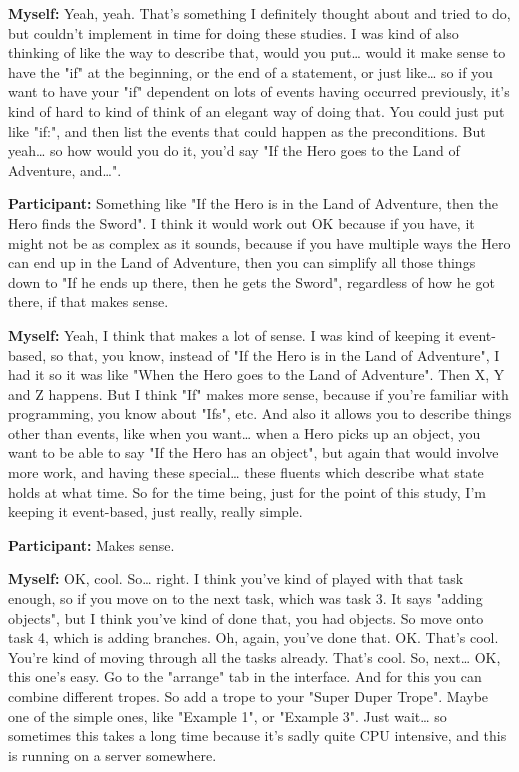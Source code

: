 \documentclass[11pt]{report}
\begin{document}
\begin{linenumbers}
\textbf{Myself:} Yeah, yeah. That's something I definitely thought about and tried to do, but couldn't implement in time for doing these studies. I was kind of also thinking of like the way to describe that, would you put\ldots{} would it make sense to have the "if" at the beginning, or the end of a statement, or just like\ldots{} so if you want to have your "if" dependent on lots of events having occurred previously, it's kind of hard to kind of think of an elegant way of doing that. You could just put like "if:", and then list the events that could happen as the preconditions. But yeah\ldots{} so how would you do it, you'd say "If the Hero goes to the Land of Adventure, and\ldots{}".

\textbf{Participant:} Something like "If the Hero is in the Land of Adventure, then the Hero finds the Sword". I think it would work out OK because if you have, it might not be as complex as it sounds, because if you have multiple ways the Hero can end up in the Land of Adventure, then you can simplify all those things down to "If he ends up there, then he gets the Sword", regardless of how he got there, if that makes sense.

\textbf{Myself:} Yeah, I think that makes a lot of sense. I was kind of keeping it event-based, so that, you know, instead of "If the Hero is in the Land of Adventure", I had it so it was like "When the Hero goes to the Land of Adventure". Then X, Y and Z happens. But I think "If" makes more sense, because if you're familiar with programming, you know about "Ifs", etc. And also it allows you to describe things other than events, like when you want\ldots{} when a Hero picks up an object, you want to be able to say "If the Hero has an object", but again that would involve more work, and having these special\ldots{} these fluents which describe what state holds at what time. So for the time being, just for the point of this study, I'm keeping it event-based, just really, really simple.

\textbf{Participant:} Makes sense.

\textbf{Myself:} OK, cool. So\ldots{} right. I think you've kind of played with that task enough, so if you move on to the next task, which was task 3. It says "adding objects", but I think you've kind of done that, you had objects. So move onto task 4, which is adding branches. Oh, again, you've done that. OK. That's cool. You're kind of moving through all the tasks already. That's cool. So, next\ldots{} OK, this one's easy. Go to the "arrange" tab in the interface. And for this you can combine different tropes. So add a trope to your "Super Duper Trope". Maybe one of the simple ones, like "Example 1", or "Example 3". Just wait\ldots{} so sometimes this takes a long time because it's sadly quite CPU intensive, and this is running on a server somewhere.


\end{linenumbers}
\end{document}
